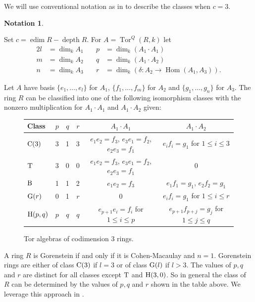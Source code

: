 \documentclass[reqno]{amsart}
\DeclareMathOperator{\Hom}{Hom}
\DeclareMathOperator{\rank}{dim}
\DeclareMathOperator{\edim}{edim}
\DeclareMathOperator{\Tor}{Tor}
\DeclareMathOperator{\depth}{depth}
\renewcommand{\H}{{\rm H}}
\newcommand{\G}{{\rm G}}
\newcommand{\T}{{\rm T}}
\newcommand{\B}{{\rm B}}
\newcommand{\C}{{\rm C}}
\theoremstyle{plain} %
\theoremstyle{definition}
\newtheorem{notation}[theorem]{Notation}
\theoremstyle{remark}
\begin{document}
We will use conventional notation as in \cite{Avramov} to describe the classes when $c=3$. 
\begin{notation}\label{notation_for_Tor_invariants}

    Set $c=\edim R-\depth R$.
    For 
   $ A=\Tor^Q(R,k)$ let
    \begin{alignat*}{2}
    {l} &=\rank_k A_1 &\quad p&=\rank_k(A_1\cdot A_1)\\
    m&=\rank_kA_2 &\quad q&=\rank_k(A_1\cdot A_2)\\
    n&=\rank_k A_3 &\quad   r&=\rank_k(\delta:A_2\to \Hom(A_1,A_3)).
\end{alignat*}
    
\end{notation}


Let $A$ have basis $\{e_1,\ldots,e_{l}\}$ 
for $A_1$, $\{f_1,\ldots,f_m\}$ for $A_2$ and $\{g_1,\ldots,g_n\}$ for $A_3$.
The ring $R$ can be classified into one of the following isomorphism classes with the nonzero multiplication for $A_1\cdot A_1$ and $A_1\cdot A_2$ given: 

\begin{figure}[h!]    
\renewcommand{\arraystretch}{1.2}
\begin{tabular}{|l|c c c |c c|}
    \hline
Class & $p$& $q$ & $r$ & $A_1\cdot A_1$ & $A_1\cdot A_2$ \\ 
\hline
 $\C(3)$ & 3 & 1 & 3 &
         $e_1e_2=f_3$, $e_3e_1=f_2$, $e_2e_3=f_1$ & 
       $e_if_i=g_1$ for $1\leq i\leq 3$ \\ 
$\T$ & 3 & 0 & 0 &
    $e_1e_2=f_3$, $e_3e_1=f_2$, $e_2e_3=f_1$ & 
    0 \\ 
$\B$ & 1 & 1 & 2 &
    $e_1e_2=f_3$ & 
    $e_1f_1=g_1$, $e_2f_2=g_1$ \\
$\G(r)
$ & 0 & 1 & $r$ &
    0 &
    $e_if_i=g_1$ for $1\leq i\leq r$ \\ 
$\H(p,q)$ & $p$ & $q$ & $q$ &
    $e_{p+1}e_i=f_i$ for $1\leq i\leq p$ &
    $e_{p+1}f_{p+j}=g_j$ for $1\leq j\leq q$\\
    \hline
\end{tabular}
\caption{Tor algebras of codimension 3 rings.}
\label{fig: codim 3}
\end{figure}



A ring $R$ is Gorenstein if and only if it is Cohen-Macaulay and $n=1$. Gorenstein rings are either of class $\C(3)$ if $l=3$ 
or of class $\G(l)$ if $l>3$. 
The values of $p,q$ and $r$ are distinct for all classes except $\T$ and $\H(3,0)$. 
So in general the class of $R$ can be determined by the values of $p,q$ and $r$ shown in the table above. We leverage this approach in .
\end{document}
